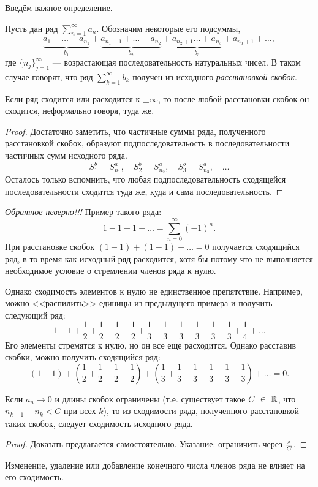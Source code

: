 \documentclass[a4paper, 12pt]{article}
\begin{document}
Введём важное определение.

\begin{Def}
	Пусть дан ряд $\sum\limits_{n=1}^{\infty}a_n$. Обозначим некоторые его подсуммы,
	$$
	\underbrace{a_1 + \ldots + a_{n_1}}_{b_1} + \underbrace{a_{n_1+1} + \ldots + a_{n_2}}_{b_2} + \underbrace{a_{n_2 + 1} \ldots + a_{n_3}}_{b_3} + a_{n_3 + 1} + \ldots,
	 $$
	 где $\{n_j\}_{j=1}^{\infty}$ --- возрастающая последовательность натуральных чисел. В таком случае говорят, что ряд $\sum\limits_{k =1}^{\infty} b_k$ получен из исходного \emph{расстановкой скобок}.
\end{Def}
\begin{Statement}
	Если ряд сходится или расходится к $\pm \infty$, то после любой расстановки скобок он сходится, неформально говоря, туда же.
\end{Statement}

\begin{proof}
	Достаточно заметить, что частичные суммы ряда, полученного расстановкой скобок, образуют подпоследовательость в последовательности частичных сумм исходного ряда.
	$$
	S^b_1 = S^a_{n_1}, \quad S^b_{2} = S^a_{n_2}, \quad S^b_3 = S^a_{n_3}, \quad \ldots
	$$
	Осталось только вспомнить, что любая подпоследовательность сходящейся последовательности сходится туда же, куда и сама последовательность.
\end{proof}
\emph{Обратное неверно!!!} Пример такого ряда:
$$
1 - 1 + 1 - \ldots = \sum\limits_{n = 0}^{\infty} \left(-1\right)^n.
$$
При расстановке скобок $(1 - 1) + (1 - 1) + \ldots = 0$ получается сходящийся ряд, в то время как исходный ряд расходится, хотя бы потому что не выполняется необходимое условие о стремлении членов ряда к нулю.

Однако сходимость элементов к нулю не единственное препятствие. Например, можно <<распилить>> единицы из предыдущего примера и получить следующий ряд:
$$
1 - 1 + \frac{1}{2} + \frac{1}{2} - \frac{1}{2} - \frac{1}{2} + \frac{1}{3} + \frac{1}{3} + \frac{1}{3} - \frac{1}{3} - \frac{1}{3} - \frac{1}{3} + \frac{1}{4} + \ldots
$$
Его элементы стремятся к нулю, но он все еще расходится. Однако расставив скобки, можно получить сходящийся ряд:
$$
(1 - 1) + \left(\frac{1}{2} + \frac{1}{2} - \frac{1}{2} - \frac{1}{2}\right) +\left( \frac{1}{3} + \frac{1}{3} + \frac{1}{3} - \frac{1}{3} - \frac{1}{3} - \frac{1}{3}\right) + \ldots = 0.
$$
\begin{Statement}
	Если $a_n \to 0$ и длины скобок ограничены (т.е. существует такое $C~\in~\mathbb{R}$, что $n_{k+1} - n_{k} < C$ при всех $k$), то из сходимости ряда, полученного расстановкой таких скобок, следует сходимость исходного ряда.
\end{Statement}
\begin{proof}
Доказать предлагается самостоятельно. Указание: ограничить через $\frac{\varepsilon}{C}$.
\end{proof}
\begin{Statement}
	Изменение, удаление или добавление конечного числа членов ряда не влияет на его сходимость.
\end{Statement}
\end{document}
